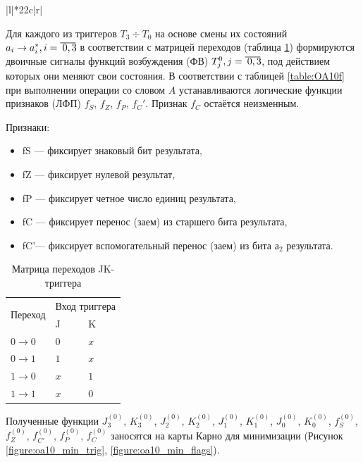 \begin{landscape}
\begin{table}[H]
\begin{tabular}{|l|*{22}{c|}{r|}}
	\end{tabular}
\end{table}
\end{landscape}

Для каждого из триггеров $T_3 \div T_0$ на основе смены их состояний $a_i \rightarrow a^{*}_i, i=\oline{0,3}$ в соответствии с матрицей переходов (таблица \ref{table:JK_SMW}) формируются двоичные сигналы функций возбуждения (ФВ) $T^0_j, j=\oline{0,3}$, под действием которых они меняют свои состояния. В соответствии с таблицей \ref{table:OA10f} при выполнении операции со словом $A$ устанавливаются логические функции признаков (ЛФП) $f_S$, $f_Z$, $f_P$, $f_C'$. Признак $f_C$ остаётся неизменным.

Признаки:
\begin{itemize}
	\item fS --- фиксирует знаковый бит результата,
	\item fZ --- фиксирует нулевой результат,
	\item fP --- фиксирует четное число единиц результата,
	\item fC --- фиксирует перенос (заем) из старшего бита результата,
	\item fC’---  фиксирует вспомогательный перенос (заем) из бита $а_2$ результата.
\end{itemize}

\begin{table}[H]
	\centering
	\caption{Матрица переходов JK-триггера}
	\label{table:JK_SMW}
	\begin{tabular}{| l | p{1cm} | p{1cm} |} \hline
		\multirow{2}{*}{Переход} & \multicolumn{2}{c|}{Вход триггера}\\ \cline{2-3}
		& J & K \\ \hline
		$0 \rightarrow 0$ & 	$0$ & $x$ \\ \hline
		$0 \rightarrow 1$ & 	$1$ & $x$ \\ \hline
		$1 \rightarrow 0$ & 	$x$ & $1$ \\ \hline
		$1 \rightarrow 1$ & 	$x$ & $0$ \\ \hline
	\end{tabular}
\end{table}

Полученные функции  $J^{(0)}_{3}$, $K^{(0)}_{3}$, $J^{(0)}_{2}$, $K^{(0)}_{2}$, $J^{(0)}_{1}$, $K^{(0)}_{1}$, $J^{(0)}_{0}$, $K^{(0)}_{0}$, $f^{(0)}_{S}$, $f^{(0)}_{Z}$, $f^{(0)}_{C'}$, $f^{(0)}_{P}$, $f^{(0)}_{C}$  заносятся на карты Карно для минимизации (Рисунок \ref{figure:oa10_min_trig}, \ref{figure:oa10_min_flags}).

